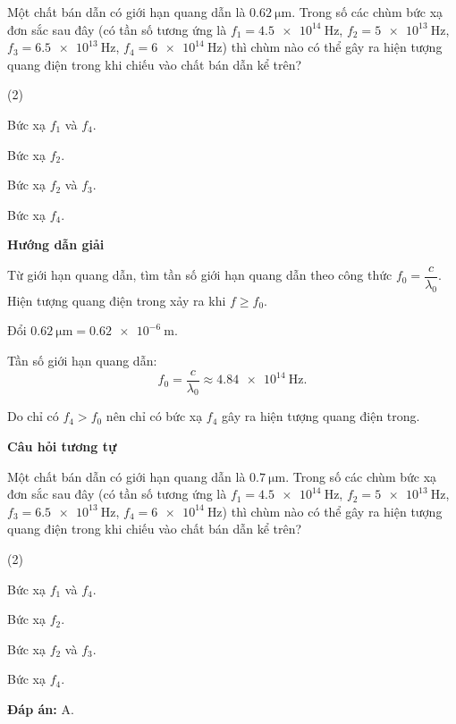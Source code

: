 {Một chất bán dẫn có giới hạn quang dẫn là $\SI{0.62}{\micro \meter}$. Trong số các chùm bức xạ đơn sắc sau đây (có tần số tương ứng là $f_1=\SI{4.5e14}{\hertz}$, $f_2=\SI{5e13}{\hertz}$, $f_3=\SI{6.5e13}{\hertz}$, $f_4=\SI{6e14}{\hertz}$) thì chùm nào có thể gây ra hiện tượng quang điện trong khi chiếu vào chất bán dẫn kể trên?
	\begin{mcq}(2)
		\item Bức xạ $f_1$ và $f_4$.
		\item Bức xạ $f_2$.
		\item Bức xạ $f_2$ và $f_3$.
		\item Bức xạ $f_4$.
	\end{mcq}
}{\begin{center}
		\textbf{Hướng dẫn giải}
	\end{center}
	
	Từ giới hạn quang dẫn, tìm tần số giới hạn quang dẫn theo công thức $f_0=\dfrac{c}{\lambda_0}$. Hiện tượng quang điện trong xảy ra khi $f \geq f_0$.
	
	Đổi $\SI{0.62}{\micro \meter} = \SI{0.62e-6}{\meter}$.
	
	Tần số giới hạn quang dẫn:
	\begin{equation*}
		f_0=\dfrac{c}{\lambda_0} \approx \SI{4.84e14}{\hertz}.
	\end{equation*}
	
	Do chỉ có $f_4 > f_0$ nên chỉ có bức xạ $f_4$ gây ra hiện tượng quang điện trong.
	
	\begin{center}
		\textbf{Câu hỏi tương tự}
	\end{center}
	
	Một chất bán dẫn có giới hạn quang dẫn là $\SI{0.7}{\micro \meter}$. Trong số các chùm bức xạ đơn sắc sau đây (có tần số tương ứng là $f_1=\SI{4.5e14}{\hertz}$, $f_2=\SI{5e13}{\hertz}$, $f_3=\SI{6.5e13}{\hertz}$, $f_4=\SI{6e14}{\hertz}$) thì chùm nào có thể gây ra hiện tượng quang điện trong khi chiếu vào chất bán dẫn kể trên?
	\begin{mcq}(2)
		\item Bức xạ $f_1$ và $f_4$.
		\item Bức xạ $f_2$.
		\item Bức xạ $f_2$ và $f_3$.
		\item Bức xạ $f_4$.
	\end{mcq}
	
	\textbf{Đáp án:} A.
}
